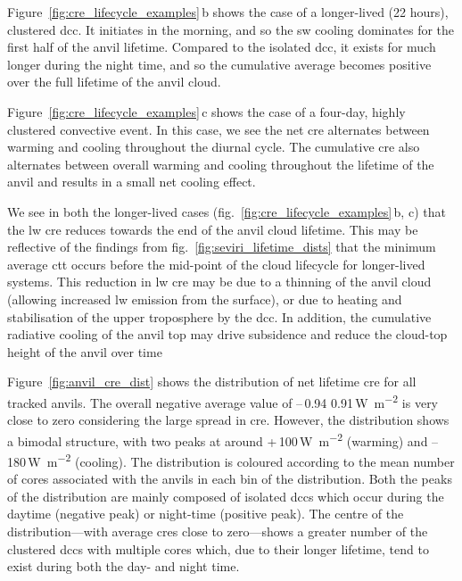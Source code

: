 \documentclass[acp, manuscript]{copernicus}
\begin{document}
Figure~\ref{fig:cre_lifecycle_examples}\,b shows the case of a longer-lived (22 hours), clustered \acrshort{dcc}. 
It initiates in the morning, and so the \acrshort{sw} cooling dominates for the first half of the anvil lifetime. 
Compared to the isolated \acrshort{dcc}, it exists for much longer during the night time, and so the cumulative average becomes positive over the full lifetime of the anvil cloud.

Figure~\ref{fig:cre_lifecycle_examples}\,c shows the case of a four-day, highly clustered convective event. 
In this case, we see the net \acrshort{cre} alternates between warming and cooling throughout the diurnal cycle. 
The cumulative \acrshort{cre} also alternates between overall warming and cooling throughout the lifetime of the anvil and results in a small net cooling effect.

We see in both the longer-lived cases (fig.~\ref{fig:cre_lifecycle_examples}\,b, c) that the \acrshort{lw} \acrshort{cre} reduces towards the end of the anvil cloud lifetime. 
This may be reflective of the findings from fig.~\ref{fig:seviri_lifetime_dists} that the minimum average \acrshort{ctt} occurs before the mid-point of the cloud lifecycle for longer-lived systems. 
This reduction in \acrshort{lw} \acrshort{cre} may be due to a thinning of the anvil cloud (allowing increased \acrshort{lw} emission from the surface), or due to heating and stabilisation of the upper troposphere by the \acrshort{dcc}.
In addition, the cumulative radiative cooling of the anvil top may drive subsidence and reduce the cloud-top height of the anvil over time \citep{sokol_tropical_2020}

Figure~\ref{fig:anvil_cre_dist} shows the distribution of net lifetime \acrshort{cre} for all tracked anvils. 
The overall negative average value of --\,0.94\,\textpm\,0.91\,\unit{W m^{-2}} is very close to zero considering the large spread in \acrshort{cre}. 
However, the distribution shows a bimodal structure, with two peaks at around +\,100\,\unit{W m^{-2}} (warming) and --\,180\,\unit{W m^{-2}} (cooling). 
The distribution is coloured according to the mean number of cores associated with the anvils in each bin of the distribution. 
Both the peaks of the distribution are mainly composed of isolated \acrshort{dcc}s which occur during the daytime (negative peak) or night-time (positive peak). 
The centre of the distribution---with average \acrshort{cre}s close to zero---shows a greater number of the clustered \acrshort{dcc}s with multiple cores which, due to their longer lifetime, tend to exist during both the day- and night time.
\end{document}
